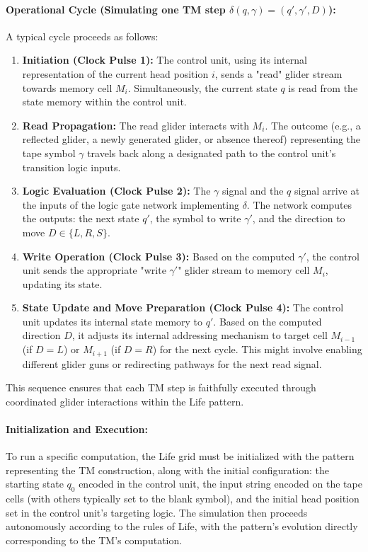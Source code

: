 \documentclass{article}
\theoremstyle{definition}
\theoremstyle{plain}
\theoremstyle{plain}
\begin{document}
\paragraph{Operational Cycle (Simulating one TM step $\delta(q, \gamma) = (q', \gamma', D)$):}
A typical cycle proceeds as follows:
\begin{enumerate}
  \item \textbf{Initiation (Clock Pulse 1):} The control unit, using its internal representation of the current head position $i$, sends a "read" glider stream towards memory cell $M_i$. Simultaneously, the current state $q$ is read from the state memory within the control unit.
  \item \textbf{Read Propagation:} The read glider interacts with $M_i$. The outcome (e.g., a reflected glider, a newly generated glider, or absence thereof) representing the tape symbol $\gamma$ travels back along a designated path to the control unit's transition logic inputs.
  \item \textbf{Logic Evaluation (Clock Pulse 2):} The $\gamma$ signal and the $q$ signal arrive at the inputs of the logic gate network implementing $\delta$. The network computes the outputs: the next state $q'$, the symbol to write $\gamma'$, and the direction to move $D \in \{L, R, S\}$.
  \item \textbf{Write Operation (Clock Pulse 3):} Based on the computed $\gamma'$, the control unit sends the appropriate "write $\gamma'$" glider stream to memory cell $M_i$, updating its state.
  \item \textbf{State Update and Move Preparation (Clock Pulse 4):} The control unit updates its internal state memory to $q'$. Based on the computed direction $D$, it adjusts its internal addressing mechanism to target cell $M_{i-1}$ (if $D=L$) or $M_{i+1}$ (if $D=R$) for the next cycle. This might involve enabling different glider guns or redirecting pathways for the next read signal.
\end{enumerate}
This sequence ensures that each TM step is faithfully executed through coordinated glider interactions within the Life pattern.

\paragraph{Initialization and Execution:}
To run a specific computation, the Life grid must be initialized with the pattern representing the TM construction, along with the initial configuration: the starting state $q_0$ encoded in the control unit, the input string encoded on the tape cells (with others typically set to the blank symbol), and the initial head position set in the control unit's targeting logic. The simulation then proceeds autonomously according to the rules of Life, with the pattern's evolution directly corresponding to the TM's computation.
\end{document}
